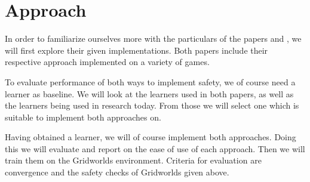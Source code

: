 \documentclass[a4paper,kul]{kulakarticle}
\begin{document}
\section{Approach}
In order to familiarize ourselves more with the particulars of the papers 
\cite{de2019foundations} and \cite{alshiekh2018safe}, we will first explore 
their given implementations. Both papers include their respective approach 
implemented on a variety of games.
\par To evaluate performance of both ways to implement safety, we of course need a learner as baseline. We will look at the learners used in both papers, as well as the learners being used in research today. From those we will select one which is suitable to implement both approaches on.
\par Having obtained a learner, we will of course implement both approaches. Doing this we will evaluate and report on the ease of use of each approach. Then we will train them on the Gridworlds environment. Criteria for evaluation are convergence and the safety checks of Gridworlds given above.

 

\end{document}
